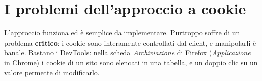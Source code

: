 
\section{I problemi dell'approccio a cookie}

L'approccio funziona ed è semplice da implementare. Purtroppo soffre di un
problema \textbf{critico}: i cookie sono interamente controllati dal client, e
manipolarli è banale. Bastano i DevTools: nella scheda \textit{Archiviazione}
di Firefox (\textit{Applicazione} in Chrome) i cookie di un sito sono elencati
in una tabella, e un doppio clic su un valore permette di modificarlo.

